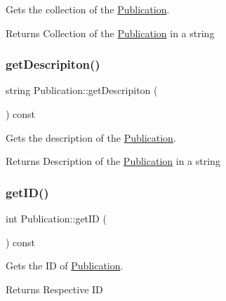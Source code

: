 Gets the collection of the \hyperlink{class_publication}{Publication}. 

\begin{DoxyReturn}{Returns}
Collection of the \hyperlink{class_publication}{Publication} in a string 
\end{DoxyReturn}
\mbox{\label{class_publication_a5cc83441c3e2dd8daaa050a18b2e6bdd}} 
\subsubsection{\texorpdfstring{get\+Descripiton()}{getDescripiton()}}
{\footnotesize\ttfamily string Publication\+::get\+Descripiton (\begin{DoxyParamCaption}{ }\end{DoxyParamCaption}) const}



Gets the description of the \hyperlink{class_publication}{Publication}. 

\begin{DoxyReturn}{Returns}
Description of the \hyperlink{class_publication}{Publication} in a string 
\end{DoxyReturn}
\mbox{\label{class_publication_ab1b5251a7e94efcb7792edbac4ff93bc}} 
\subsubsection{\texorpdfstring{get\+I\+D()}{getID()}}
{\footnotesize\ttfamily int Publication\+::get\+ID (\begin{DoxyParamCaption}{ }\end{DoxyParamCaption}) const}



Gets the ID of \hyperlink{class_publication}{Publication}. 

\begin{DoxyReturn}{Returns}
Respective ID 
\end{DoxyReturn}
\mbox{\label{class_publication_af382f9557807e8375478ceb7890e841f}} 
